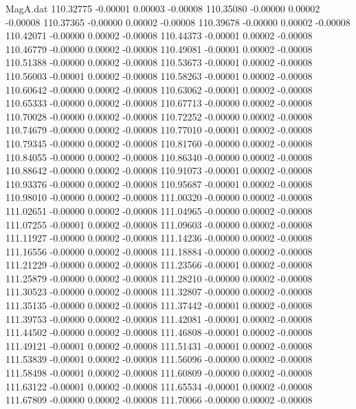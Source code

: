 \begin{filecontents}{MagA.dat}
 110.32775   -0.00001    0.00003   -0.00008
 110.35080   -0.00000    0.00002   -0.00008
 110.37365   -0.00000    0.00002   -0.00008
 110.39678   -0.00000    0.00002   -0.00008
 110.42071   -0.00000    0.00002   -0.00008
 110.44373   -0.00001    0.00002   -0.00008
 110.46779   -0.00000    0.00002   -0.00008
 110.49081   -0.00001    0.00002   -0.00008
 110.51388   -0.00000    0.00002   -0.00008
 110.53673   -0.00001    0.00002   -0.00008
 110.56003   -0.00001    0.00002   -0.00008
 110.58263   -0.00001    0.00002   -0.00008
 110.60642   -0.00000    0.00002   -0.00008
 110.63062   -0.00001    0.00002   -0.00008
 110.65333   -0.00000    0.00002   -0.00008
 110.67713   -0.00000    0.00002   -0.00008
 110.70028   -0.00000    0.00002   -0.00008
 110.72252   -0.00000    0.00002   -0.00008
 110.74679   -0.00000    0.00002   -0.00008
 110.77010   -0.00001    0.00002   -0.00008
 110.79345   -0.00000    0.00002   -0.00008
 110.81760   -0.00000    0.00002   -0.00008
 110.84055   -0.00000    0.00002   -0.00008
 110.86340   -0.00000    0.00002   -0.00008
 110.88642   -0.00000    0.00002   -0.00008
 110.91073   -0.00001    0.00002   -0.00008
 110.93376   -0.00000    0.00002   -0.00008
 110.95687   -0.00001    0.00002   -0.00008
 110.98010   -0.00000    0.00002   -0.00008
 111.00320   -0.00000    0.00002   -0.00008
 111.02651   -0.00000    0.00002   -0.00008
 111.04965   -0.00000    0.00002   -0.00008
 111.07255   -0.00001    0.00002   -0.00008
 111.09603   -0.00000    0.00002   -0.00008
 111.11927   -0.00000    0.00002   -0.00008
 111.14236   -0.00000    0.00002   -0.00008
 111.16556   -0.00000    0.00002   -0.00008
 111.18884   -0.00000    0.00002   -0.00008
 111.21229   -0.00000    0.00002   -0.00008
 111.23566   -0.00001    0.00002   -0.00008
 111.25879   -0.00000    0.00002   -0.00008
 111.28210   -0.00000    0.00002   -0.00008
 111.30523   -0.00000    0.00002   -0.00008
 111.32807   -0.00000    0.00002   -0.00008
 111.35135   -0.00000    0.00002   -0.00008
 111.37442   -0.00001    0.00002   -0.00008
 111.39753   -0.00000    0.00002   -0.00008
 111.42081   -0.00001    0.00002   -0.00008
 111.44502   -0.00000    0.00002   -0.00008
 111.46808   -0.00001    0.00002   -0.00008
 111.49121   -0.00001    0.00002   -0.00008
 111.51431   -0.00001    0.00002   -0.00008
 111.53839   -0.00001    0.00002   -0.00008
 111.56096   -0.00000    0.00002   -0.00008
 111.58498   -0.00001    0.00002   -0.00008
 111.60809   -0.00000    0.00002   -0.00008
 111.63122   -0.00001    0.00002   -0.00008
 111.65534   -0.00001    0.00002   -0.00008
 111.67809   -0.00000    0.00002   -0.00008
 111.70066   -0.00000    0.00002   -0.00008

\end{filecontents}
